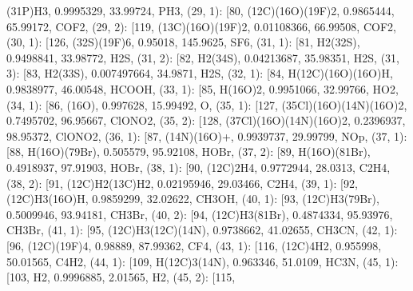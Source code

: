 \documentclass[letterpaper,10pt,english]{sphinxmanual}
\begin{document}
\begin{fulllineitems}
\textquotesingle{}(31P)H3\textquotesingle{}, 0.9995329, 33.99724, \textquotesingle{}PH3\textquotesingle{}{]}, (29, 1): {[}80, \textquotesingle{}(12C)(16O)(19F)2\textquotesingle{}, 0.9865444, 65.99172, \textquotesingle{}COF2\textquotesingle{}{]}, (29, 2): {[}119, \textquotesingle{}(13C)(16O)(19F)2\textquotesingle{}, 0.01108366, 66.99508, \textquotesingle{}COF2\textquotesingle{}{]}, (30, 1): {[}126, \textquotesingle{}(32S)(19F)6\textquotesingle{}, 0.95018, 145.9625, \textquotesingle{}SF6\textquotesingle{}{]}, (31, 1): {[}81, \textquotesingle{}H2(32S)\textquotesingle{}, 0.9498841, 33.98772, \textquotesingle{}H2S\textquotesingle{}{]}, (31, 2): {[}82, \textquotesingle{}H2(34S)\textquotesingle{}, 0.04213687, 35.98351, \textquotesingle{}H2S\textquotesingle{}{]}, (31, 3): {[}83, \textquotesingle{}H2(33S)\textquotesingle{}, 0.007497664, 34.9871, \textquotesingle{}H2S\textquotesingle{}{]}, (32, 1): {[}84, \textquotesingle{}H(12C)(16O)(16O)H\textquotesingle{}, 0.9838977, 46.00548, \textquotesingle{}HCOOH\textquotesingle{}{]}, (33, 1): {[}85, \textquotesingle{}H(16O)2\textquotesingle{}, 0.9951066, 32.99766, \textquotesingle{}HO2\textquotesingle{}{]}, (34, 1): {[}86, \textquotesingle{}(16O)\textquotesingle{}, 0.997628, 15.99492, \textquotesingle{}O\textquotesingle{}{]}, (35, 1): {[}127, \textquotesingle{}(35Cl)(16O)(14N)(16O)2\textquotesingle{}, 0.7495702, 96.95667, \textquotesingle{}ClONO2\textquotesingle{}{]}, (35, 2): {[}128, \textquotesingle{}(37Cl)(16O)(14N)(16O)2\textquotesingle{}, 0.2396937, 98.95372, \textquotesingle{}ClONO2\textquotesingle{}{]}, (36, 1): {[}87, \textquotesingle{}(14N)(16O)+\textquotesingle{}, 0.9939737, 29.99799, \textquotesingle{}NOp\textquotesingle{}{]}, (37, 1): {[}88, \textquotesingle{}H(16O)(79Br)\textquotesingle{}, 0.505579, 95.92108, \textquotesingle{}HOBr\textquotesingle{}{]}, (37, 2): {[}89, \textquotesingle{}H(16O)(81Br)\textquotesingle{}, 0.4918937, 97.91903, \textquotesingle{}HOBr\textquotesingle{}{]}, (38, 1): {[}90, \textquotesingle{}(12C)2H4\textquotesingle{}, 0.9772944, 28.0313, \textquotesingle{}C2H4\textquotesingle{}{]}, (38, 2): {[}91, \textquotesingle{}(12C)H2(13C)H2\textquotesingle{}, 0.02195946, 29.03466, \textquotesingle{}C2H4\textquotesingle{}{]}, (39, 1): {[}92, \textquotesingle{}(12C)H3(16O)H\textquotesingle{}, 0.9859299, 32.02622, \textquotesingle{}CH3OH\textquotesingle{}{]}, (40, 1): {[}93, \textquotesingle{}(12C)H3(79Br)\textquotesingle{}, 0.5009946, 93.94181, \textquotesingle{}CH3Br\textquotesingle{}{]}, (40, 2): {[}94, \textquotesingle{}(12C)H3(81Br)\textquotesingle{}, 0.4874334, 95.93976, \textquotesingle{}CH3Br\textquotesingle{}{]}, (41, 1): {[}95, \textquotesingle{}(12C)H3(12C)(14N)\textquotesingle{}, 0.9738662, 41.02655, \textquotesingle{}CH3CN\textquotesingle{}{]}, (42, 1): {[}96, \textquotesingle{}(12C)(19F)4\textquotesingle{}, 0.98889, 87.99362, \textquotesingle{}CF4\textquotesingle{}{]}, (43, 1): {[}116, \textquotesingle{}(12C)4H2\textquotesingle{}, 0.955998, 50.01565, \textquotesingle{}C4H2\textquotesingle{}{]}, (44, 1): {[}109, \textquotesingle{}H(12C)3(14N)\textquotesingle{}, 0.963346, 51.0109, \textquotesingle{}HC3N\textquotesingle{}{]}, (45, 1): {[}103, \textquotesingle{}H2\textquotesingle{}, 0.9996885, 2.01565, \textquotesingle{}H2\textquotesingle{}{]}, (45, 2): {[}115, 
\end{fulllineitems}
\end{document}
